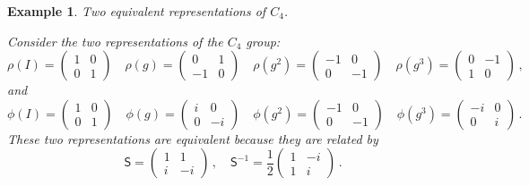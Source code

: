 \documentclass{article}
\theoremstyle{plain}\theoremheaderfont{\normalfont\itshape}\theorembodyfont{\rmfamily}\theoremseparator{.}\newtheorem*{rem}{Remark}\newtheorem*{ex}{Example}\newtheorem*{proof}{Proof}\newtheorem*{altp}{Alternative proof}
\theoremstyle{plain}\theoremheaderfont{\normalfont\bfseries}\theorembodyfont{\rmfamily}\theoremseparator{.}\newtheorem{thm}{Theorem}[section]\newtheorem{lem}[thm]{Lemma}\newtheorem{prop}[thm]{Proposition}\newtheorem*{cor}{Corollary}\newtheorem{defn}[thm]{Definition}\newtheorem{clm}[thm]{Claim}\newtheorem{clminproof}{Claim}
\theoremstyle{break}\theoremheaderfont{\normalfont\itshape}\theorembodyfont{\rmfamily}\theoremseparator{.\medskip}\newtheorem*{proofskip}{Proof}\newtheorem*{exs}{Examples}\newtheorem*{rems}{Remarks}
\theoremstyle{break}\theoremheaderfont{\normalfont\bfseries}\theorembodyfont{\rmfamily}\theoremseparator{.\medskip}\newtheorem{lemskip}[thm]{Lemma}\newtheorem{defnskip}[thm]{Definition}\newtheorem{propskip}[thm]{Proposition}\newtheorem{thmskip}[thm]{Theorem}
\numberwithin{equation}{section}
\begin{document}
	\begin{ex}
		\textit{Two equivalent representations of \(C_4\).}

		Consider the two representations of the \(C_4\) group:
		\[\rho(I)=\begin{pmatrix}
			1 & 0\\
			0 & 1
		\end{pmatrix}\quad\rho(g)=\begin{pmatrix}
			0 & 1\\
			-1 & 0
		\end{pmatrix}\quad\rho(g^2)=\begin{pmatrix}
			-1 & 0\\
			0 & -1
		\end{pmatrix}\quad\rho(g^3)=\begin{pmatrix}
			0 & -1\\
			1 & 0
		\end{pmatrix}\,,\]
		and
		\[\phi(I)=\begin{pmatrix}
			1 & 0\\
			0 & 1
		\end{pmatrix}\quad\phi(g)=\begin{pmatrix}
			i & 0\\
			0 & -i
		\end{pmatrix}\quad\phi(g^2)=\begin{pmatrix}
			-1 & 0\\
			0 & -1
		\end{pmatrix}\quad\phi(g^3)=\begin{pmatrix}
			-i & 0\\
			0 & i
		\end{pmatrix}\,.\]
		These two representations are equivalent because they are related by
		\[\mathsf{S}=\begin{pmatrix}
			1 & 1\\
			i & -i
		\end{pmatrix}\,,\quad\mathsf{S}^{-1}=\frac{1}{2}\begin{pmatrix}
			1 & -i\\
			1 & i
		\end{pmatrix}\,.\]
	\end{ex}
\end{document}
